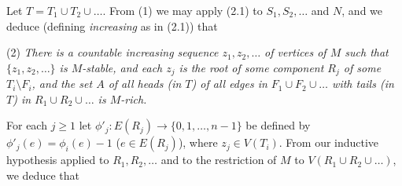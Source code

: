 Let $T = T_1 \cup T_2 \cup \dots$. From (1) we may apply (2.1) to $S_1, S_2, \dots$ and $N$, and we deduce (defining \textit{increasing} as in (2.1)) that

\hspace*{12pt}(2) \textit{There is a countable increasing sequence $z_1, z_2, \dots$ of vertices of $M$ such that $\{z_1, z_2, \dots\}$ is $M$-stable, and each $z_j$ is the root of some component $R_j$ of some $T_i \setminus F_i$, and the set $A$ of all heads (in $T$) of all edges in $F_1 \cup F_2 \cup \dots$ with tails (in $T$) in $R_1 \cup R_2 \cup \dots$ is $M$-rich.}

For each $j \ge 1$ let $\phi'_j: E(R_j) \to \{0, 1, \dots, n - 1\}$ be defined by $\phi'_j(e) = \phi_i(e) - 1$ ($e \in E(R_j)$), where $z_j \in V(T_i)$. From our inductive hypothesis applied to $R_1, R_2, \dots$ and to the restriction of $M$ to $V(R_1 \cup R_2 \cup \dots)$, we deduce that
